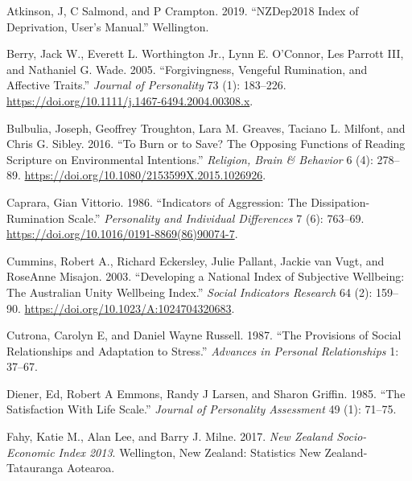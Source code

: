 \documentclass[
  singlecolumn]{report}
\newlength{\cslhangindent}
\newlength{\cslentryspacingunit} %
\newenvironment{CSLReferences}[2] %
 {%
  \setlength{\parindent}{0pt}
  \ifodd #1
  \let\oldpar\par
  \def\par{\hangindent=\cslhangindent\oldpar}
  \fi
  \setlength{\parskip}{#2\cslentryspacingunit}
 }%
 {}
\begin{document}
\hypertarget{refs}{}
\begin{CSLReferences}{1}{0}
\leavevmode{}%
Atkinson, J, C Salmond, and P Crampton. 2019. {``NZDep2018 Index of
Deprivation, User{'}s Manual.''} Wellington.

\leavevmode{}%
Berry, Jack W., Everett L. Worthington Jr., Lynn E. O'Connor, Les
Parrott III, and Nathaniel G. Wade. 2005. {``Forgivingness, Vengeful
Rumination, and Affective Traits.''} \emph{Journal of Personality} 73
(1): 183--226. \url{https://doi.org/10.1111/j.1467-6494.2004.00308.x}.

\leavevmode{}%
Bulbulia, Joseph, Geoffrey Troughton, Lara M. Greaves, Taciano L.
Milfont, and Chris G. Sibley. 2016. {``To Burn or to Save? The Opposing
Functions of Reading Scripture on Environmental Intentions.''}
\emph{Religion, Brain \& Behavior} 6 (4): 278--89.
\url{https://doi.org/10.1080/2153599X.2015.1026926}.

\leavevmode{}%
Caprara, Gian Vittorio. 1986. {``Indicators of Aggression: The
Dissipation-Rumination Scale.''} \emph{Personality and Individual
Differences} 7 (6): 763--69.
\url{https://doi.org/10.1016/0191-8869(86)90074-7}.

\leavevmode{}%
Cummins, Robert A., Richard Eckersley, Julie Pallant, Jackie van Vugt,
and RoseAnne Misajon. 2003. {``Developing a National Index of Subjective
Wellbeing: The Australian Unity Wellbeing Index.''} \emph{Social
Indicators Research} 64 (2): 159--90.
\url{https://doi.org/10.1023/A:1024704320683}.

\leavevmode{}%
Cutrona, Carolyn E, and Daniel Wayne Russell. 1987. {``The Provisions of
Social Relationships and Adaptation to Stress.''} \emph{Advances in
Personal Relationships} 1: 37--67.

\leavevmode{}%
Diener, Ed, Robert A Emmons, Randy J Larsen, and Sharon Griffin. 1985.
{``The Satisfaction With Life Scale.''} \emph{Journal of Personality
Assessment} 49 (1): 71--75.

\leavevmode{}%
Fahy, Katie M., Alan Lee, and Barry J. Milne. 2017. \emph{New Zealand
Socio-Economic Index 2013}. Wellington, New Zealand: Statistics New
Zealand-Tatauranga Aotearoa.


\end{CSLReferences}
\end{document}
